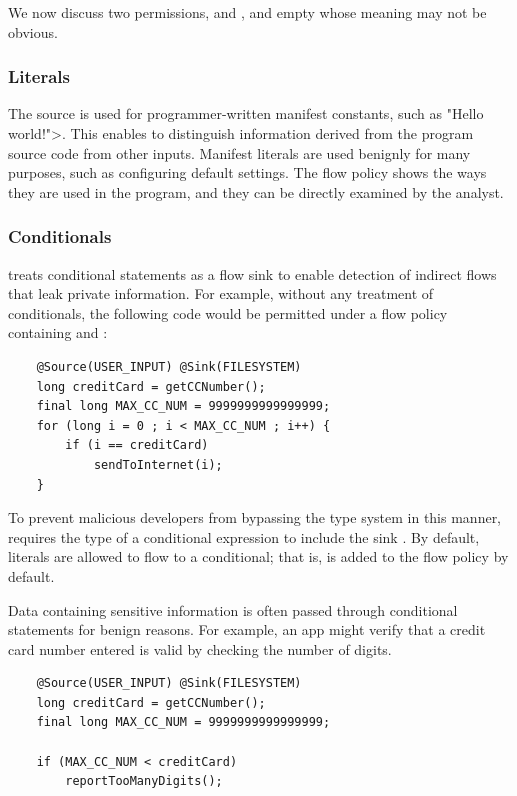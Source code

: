 

We now discuss two permissions,  and , and empty  whose meaning may not be obvious.

\subsubsection{Literals}
The  source is used for programmer-written manifest
constants, such as \<"Hello world!">.
This enables \theFlowChecker to distinguish information derived
from the program source code from other inputs.
Manifest literals are used benignly for many 
purposes, such as configuring default settings.
The flow policy shows the ways they are used in the program, and they can
be directly examined by the analyst.


\subsubsection{Conditionals \label{sec:conditionals}}
\TheFlowChecker treats conditional statements as a flow sink
to enable detection of indirect flows that leak private information.
For example, without any treatment of conditionals, the following code would
be permitted under a flow policy containing  and :

\begin{Verbatim}
    @Source(USER_INPUT) @Sink(FILESYSTEM)
    long creditCard = getCCNumber();
    final long MAX_CC_NUM = 9999999999999999;
    for (long i = 0 ; i < MAX_CC_NUM ; i++) {
        if (i == creditCard)
            sendToInternet(i);
    }
\end{Verbatim}

To prevent malicious developers from bypassing the type system in this manner,
\theFlowChecker requires the type of a
conditional expression to include the sink .
By default, literals are allowed to flow
to a conditional; that is,  is added to the flow policy by default.

Data containing sensitive information is often passed through conditional statements for benign reasons.  
For example, an app might verify that a credit card number entered is valid by checking the number of digits.

\begin{Verbatim}
    @Source(USER_INPUT) @Sink(FILESYSTEM)
    long creditCard = getCCNumber();
    final long MAX_CC_NUM = 9999999999999999;

    if (MAX_CC_NUM < creditCard)
        reportTooManyDigits();
\end{Verbatim}

